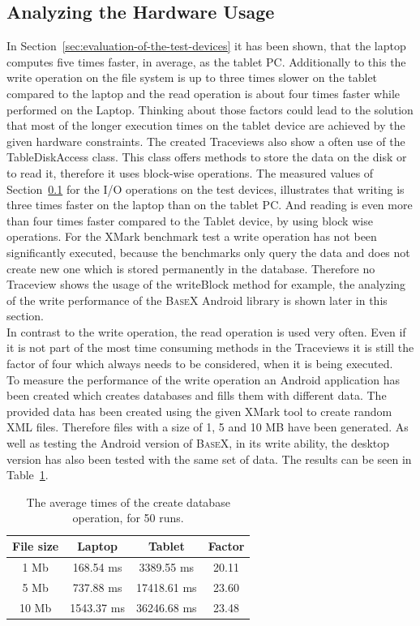 \newpage
\subsection{Analyzing the Hardware Usage}
\label{sec:analyzing-the-hardware-usage}
In Section~\ref{sec:evaluation-of-the-test-devices} it has been shown, that the laptop computes five times faster, in average, as the tablet PC.
Additionally to this the write operation on the file system is up to three times slower on the tablet compared to the laptop and the read operation is about four times faster while performed on the Laptop.
Thinking about those factors could lead to the solution that most of the longer execution times on the tablet device are achieved by the given hardware constraints.
The created Traceviews also show a often use of the \textsf{TableDiskAccess} class.
This class offers methods to store the data on the disk or to read it, therefore it uses block-wise operations.
The measured values of Section~\ref{sec:analyzing-the-hardware-usage} for the I/O operations on the test devices, illustrates that writing is three times faster on the laptop than on the tablet PC.
And reading is even more than four times faster compared to the Tablet device, by using block wise operations.
For the XMark benchmark test a write operation has not been significantly executed, because the benchmarks only query the data and does not create new one which is stored permanently in the database.
Therefore no Traceview shows the usage of the \textsf{writeBlock} method for example, the analyzing of the write performance of the \textsc{BaseX} Android library is shown later in this section.\\
In contrast to the write operation, the read operation is used very often.
Even if it is not part of the most time consuming methods in the Traceviews it is still the factor of four which always needs to be considered, when it is being executed.\\
To measure the performance of the write operation an Android application has been created which creates databases and fills them with different data.
The provided data has been created using the given XMark tool to create random XML files.
Therefore files with a size of 1, 5 and 10 MB have been generated.
As well as testing the Android version of \textsc{BaseX}, in its write ability, the desktop version has also been tested with the same set of data.
The results can be seen in Table~\ref{tab:average-times-create-db}.
\begin{table}[htpb]
	\centering
	\begin{tabular}{|c|c|c||c|}
		\hline
		File size&Laptop&Tablet&Factor\\
		\hline
		1 Mb&168.54 ms&3389.55 ms&20.11\\
		\hline
		5 Mb&737.88 ms&17418.61 ms&23.60\\
		\hline
		10 Mb&1543.37 ms&36246.68 ms&23.48\\
		\hline
	\end{tabular}
	\caption{The average times of the create database operation, for 50 runs.}
	\label{tab:average-times-create-db}
\end{table}

